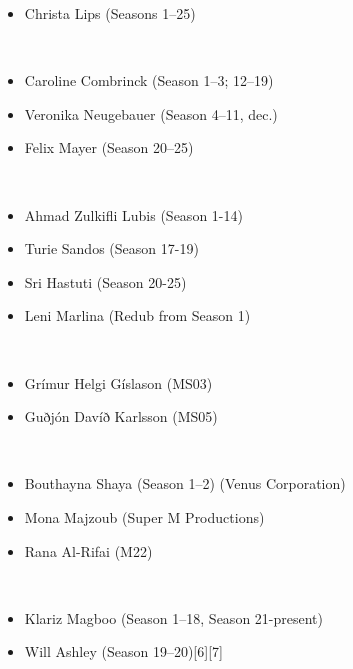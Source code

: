 \documentclass[a4paper,12pt]{article}
\begin{document}
\begin{itemize}
\item Christa Lips (Seasons 1–25)
\end{itemize}\\ \par \vspace{0.5cm}

\begin{itemize}
\item Caroline Combrinck (Season 1–3; 12–19)
\item Veronika Neugebauer (Season 4–11, dec.)
\item Felix Mayer (Season 20–25)
\end{itemize}\\ \par \vspace{0.5cm}

\begin{itemize}
\item Ahmad Zulkifli Lubis (Season 1-14)
\item Turie Sandos (Season 17-19)
\item Sri Hastuti (Season 20-25)
\item Leni Marlina (Redub from Season 1)
\end{itemize}\\ \par \vspace{0.5cm}

\begin{itemize}
\item Grímur Helgi Gíslason (MS03)
\item Guðjón Davíð Karlsson (MS05)
\end{itemize}\\ \par \vspace{0.5cm}

\begin{itemize}
\item Bouthayna Shaya (Season 1–2) (Venus Corporation)
\item Mona Majzoub (Super M Productions)
\item Rana Al-Rifai (M22)
\end{itemize}\\ \par \vspace{0.5cm}

\begin{itemize}
\item Klariz Magboo (Season 1–18, Season 21-present)
\item Will Ashley (Season 19–20)[6][7]
\end{itemize}\\ \par \vspace{0.5cm}
\end{document}
